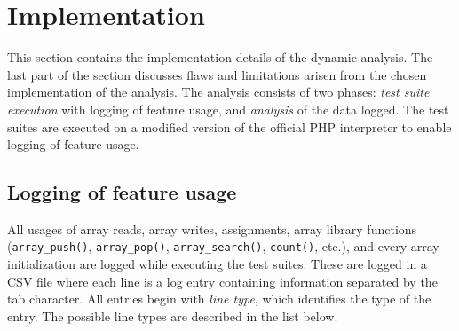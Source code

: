 \section{Implementation}
\label{sec:studyImplementation}
This section contains the implementation details of the dynamic analysis. The last part of the section discusses flaws and limitations arisen from the chosen implementation of the analysis. The analysis consists of two phases: \textit{test suite execution} with logging of feature usage, and \textit{analysis} of the data logged. The test suites are executed on a modified version of the official PHP interpreter to enable logging of feature usage.

\subsection{Logging of feature usage}
All usages of array reads, array writes, assignments, array library functions (\texttt{array\_push()}, \texttt{array\_pop()}, \texttt{array\_search()}, \texttt{count()}, etc.), and every array initialization are logged while executing the test suites. These are logged in a CSV file where each line is a log entry containing information separated by the tab character. All entries begin with  \emph{line type}, which identifies the type of the entry. The possible line types are described in the list below.

